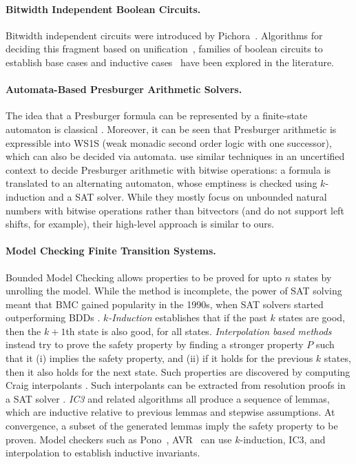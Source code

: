 \paragraph{Bitwidth Independent Boolean Circuits.}
Bitwidth independent circuits were introduced by Pichora~\cite{pichora2003automated}.
Algorithms for deciding this fragment based on unification~\cite{bjorner1998deciding},
families of boolean circuits to establish base cases and inductive cases~\citep{gupta1993parametric,gupta1993representation}
have been explored in the literature.

\paragraph{Automata-Based Presburger Arithmetic Solvers.}
The idea that a Presburger formula can be represented by a finite-state automaton is classical \cite{Büchi1960}.
Moreover, it can be seen that Presburger arithmetic is expressible into WS1S (weak monadic second order logic with one successor),
which can also be decided via automata.
%
\citet{automata-strike-back} use similar techniques in an uncertified context to
decide Presburger arithmetic with bitwise operations: a formula is translated
to an alternating automaton, whose emptiness is checked using $k$-induction and
a SAT solver.
%
While they mostly focus on unbounded natural numbers with bitwise operations
rather than bitvectors (and do not support left shifts, for example), their
high-level approach is similar to ours.

\paragraph{Model Checking Finite Transition Systems.}
Bounded Model Checking allows properties to be proved for upto $n$ states by unrolling the model.
While the method is incomplete, the power of SAT solving meant that BMC gained popularity in the 1990s,
when SAT solvers started outperforming BDDs \cite{biere1999symbolic}.
\emph{$k$-Induction} \cite{sheeran2000checking} establishes that if the past $k$ states are good, then the $k+1$th state is also good,
for all states.
\emph{Interpolation based methods} instead try to prove the safety property
by finding a stronger property $P$ such that it
(i) implies the safety property, and
(ii) if it holds for the previous $k$ states, then it also holds for the next state.
Such properties are discovered by computing Craig interpolants \cite{craig1957linear}.
Such interpolants can be extracted from resolution proofs in a SAT solver \cite{mcmillan2003interpolation}.
\emph{IC3} \cite{bradley2011sat} and related algorithms all produce a sequence of lemmas,
which are inductive relative to previous lemmas and stepwise assumptions.
At convergence, a subset of the generated lemmas imply the safety property to be proven.
Model checkers such as Pono~\cite{mann2021pono}, AVR~\cite{goel2020avr} can use $k$-induction,
IC3, and interpolation to establish inductive invariants.

